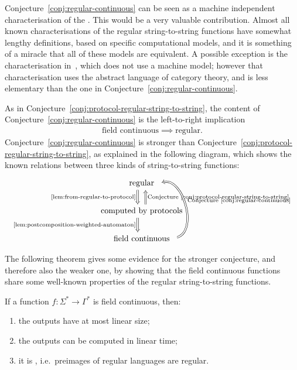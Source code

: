 Conjecture~\ref{conj:regular-continuous} can be seen as  a machine independent
characterisation of the . This would be a
very valuable contribution. Almost all known characterisations of the regular
string-to-string  functions have somewhat lengthy definitions, based on
specific computational models, and it is something of a  miracle that all of
these models are equivalent. A possible exception is the characterisation
in~\cite{bojanczykTitoRegular23}, which does not use a machine model; however
that characterisation uses the abstract language of category theory, and is
less elementary than the one in Conjecture~\ref{conj:regular-continuous}.

As in Conjecture~\ref{conj:protocol-regular-string-to-string}, the content of Conjecture~\ref{conj:regular-continuous} is the left-to-right implication
\begin{align*}
\text{field continuous} \implies \text{regular}.
\end{align*}
Conjecture~\ref{conj:regular-continuous} is stronger than Conjecture~\ref{conj:protocol-regular-string-to-string}, as explained in the following diagram, which shows the known relations between three kinds of string-to-string functions:
\[
\begin{tikzcd}
\text{regular}
\ar[d,Rightarrow,shift right=2, "\text{\cref{lem:from-regular-to-protocol}}"']
\\
\text{computed by protocols}
\ar[d,Rightarrow, shift right=2, "\text{\cref{lem:postcomposition-weighted-automaton}}"']
\ar[u,Rightarrow, shift right=2,"\text{Conjecture~\ref{conj:protocol-regular-string-to-string}}"']
\\ 
\text{field continuous} 
\ar[uu,bend right=89, Rightarrow, shift right=2,"\text{Conjecture~\ref{conj:regular-continuous}}"']
\end{tikzcd}
\]


The following theorem gives some evidence for the stronger conjecture,  and
therefore also the weaker one, by showing that the field continuous functions
share some well-known properties of the regular string-to-string functions. 

\begin{theorem}\label{thm:evidence-for-the-conjecture}
    If a function $f : \Sigma^* \to \Gamma^*$ is  field continuous, then:
    \begin{enumerate}
        \item \label{it:linear-size-outputs} the outputs have at most linear size;
        \item \label{it:linear-time-computable} the outputs can be computed in linear time;
        \item \label{it:regular-preimages} it is , i.e.~preimages of regular languages are regular.
    \end{enumerate}
\end{theorem}

